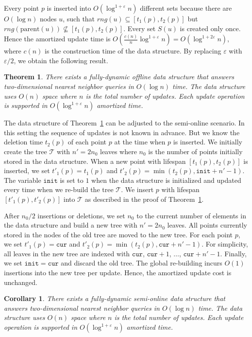 \documentclass[10pt,a4paper]{amsart}
\newcommand{\cur}{\mathtt{cur}}
\newcommand{\init}{\mathtt{init}}
\newcommand{\mcT}{\mathcal{T}}
\newcommand{\eps}{\varepsilon}
\newtheorem{theorem}{Theorem}
\newtheorem{corollary}{Corollary}
\begin{document}
Every point $p$ is inserted into $O(\log^{1+\eps} n)$ different sets because there are $O(\log n)$ nodes $u$, such that
$rng(u)\subseteq [t_{1}(p),t_{2}(p)]$ but $rng(\text{parent}(u))\not\subseteq [t_{1}(p),t_{2}(p)]$.  Every set $S(u)$ is created only once.  Hence the amortized update time is $O(\frac{c(n)}{n}\log^{1+\eps} n)=O(\log^{1+2\eps}n)$, where $c(n)$ is the construction time of the data structure. By replacing $\eps$ with $\eps/2$, we obtain the following result.  
\begin{theorem}
  \label{theor:offline}
  There exists a fully-dynamic offline data structure that answers two-dimensional nearest neighbor queries in $O(\log n)$ time. The data structure uses $O(n)$ space where $n$ is the total number of updates. Each update operation is supported in $O(\log^{1+\eps} n)$ amortized time.  
\end{theorem}

The data structure of Theorem~\ref{theor:offline} can be adjusted to the semi-online scenario.  In this setting the sequence of updates is not known in advance. But we know the deletion time $t_2(p)$ of each point $p$ at the time when $p$ is inserted. We initially create  the tree $\mcT$ with $n'=2n_0$ leaves where $n_0$ is the  number of points initially stored in the data structure. When a new point with lifespan $[t_1(p),t_2(p)]$ is inserted, we set $t'_1(p)=t_1(p)$ and $t'_2(p)=\min(t_2(p),\init +n'-1)$. The variable $\init$ is set to $1$ when the data structure is initialized and updated every time when we re-build the tree $\mcT$.  We insert $p$ with lifespan $[t'_1(p),t'_2(p)]$ into $\mcT$  as described in the proof of Theorem~\ref{theor:offline}.


After $n_0/2$ insertions or deletions, we set $n_0$ to the current number of elements in the data structure and  build a new tree with $n'=2n_0$ leaves.  All points currently stored in the nodes of the old tree are moved to the new tree. For each point $p$, we set $t'_{1}(p)=\cur$ and $t'_{2}(p)=\min(t_2(p),\cur+n'-1)$. For simplicity, all leaves in the new tree are indexed with $\cur$, $\cur+1$, $\ldots$, $\cur+n'-1$.  Finally, we set $\init= \cur$ and discard the old tree.  The global re-building incurs $O(1)$ insertions into the new tree per update.  Hence, the amortized update cost is unchanged.
\begin{corollary}
  \label{cor:semi-online}
  There exists a fully-dynamic semi-online data structure that answers two-dimensional nearest neighbor queries in $O(\log n)$ time. The data structure uses $O(n)$ space where $n$ is the total number of updates. Each update operation is supported in $O(\log^{1+\eps} n)$ amortized time.
\end{corollary}
\end{document}
